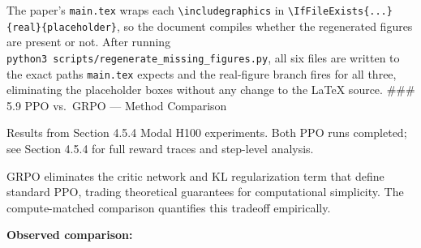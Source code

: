 \documentclass[
  american,
  11pt,
  a4paper,
  oneside]{report}
\begin{document}
The paper's \texttt{main.tex} wraps each
\texttt{\textbackslash{}includegraphics} in
\texttt{\textbackslash{}IfFileExists\{...\}\{real\}\{placeholder\}}, so
the document compiles whether the regenerated figures are present or
not. After running
\texttt{python3\ scripts/regenerate\_missing\_figures.py}, all six files
are written to the exact paths \texttt{main.tex} expects and the
real-figure branch fires for all three, eliminating the placeholder
boxes without any change to the LaTeX source. \#\#\# 5.9 PPO vs.~GRPO
--- Method Comparison

Results from Section 4.5.4 Modal H100 experiments. Both PPO runs
completed; see Section 4.5.4 for full reward traces and step-level
analysis.

GRPO eliminates the critic network and KL regularization term that
define standard PPO, trading theoretical guarantees for computational
simplicity. The compute-matched comparison quantifies this tradeoff
empirically.

\textbf{Observed comparison:}
\end{document}
